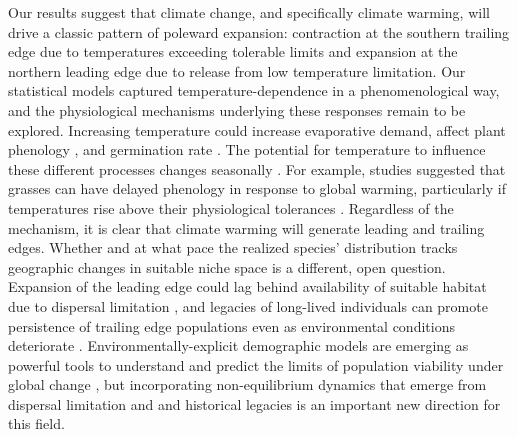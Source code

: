 \documentclass[9pt,twocolumn,twoside,lineno]{pnas-new}
\newcommand{\revise}[1]{{\color{Mahogany}{#1}}}
\begin{document}
Our results suggest that climate change, and specifically climate warming, will drive a classic pattern of poleward expansion: contraction at the southern trailing edge due to temperatures exceeding tolerable limits and expansion at the northern leading edge due to release from low temperature limitation. 
Our statistical models captured temperature-dependence in a phenomenological way, and the physiological mechanisms underlying these responses remain to be explored. 
Increasing temperature could increase evaporative demand, affect plant phenology \citep{mclean2016predicting,iler2019reproductive}, and germination rate \citep{reed2021climate}.
The potential for temperature to influence these different processes changes seasonally \citep{konapala2020climate}.
For example, studies suggested that grasses can have delayed phenology in response to global warming, particularly if temperatures rise above their physiological tolerances \citep{cleland2006diverse}.
Regardless of the mechanism, it is clear that climate warming will generate leading and trailing edges. 
Whether and at what pace the realized species' distribution tracks geographic changes in suitable niche space is a different, open question. 
Expansion of the leading edge could lag behind availability of suitable habitat due to dispersal limitation \citep{pagel2020mismatches}, and legacies of long-lived individuals can promote persistence of trailing edge populations even as environmental conditions deteriorate \revise{\citep{margaret2023trailing,bohner2020extensive}}.
Environmentally-explicit demographic models are emerging as powerful tools to understand and predict the limits of population viability under global change \citep{schultz2022climate, merow2017climate}, but incorporating non-equilibrium dynamics that emerge from dispersal limitation and and historical legacies is an important new direction for this field.
\end{document}
